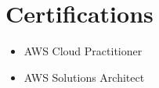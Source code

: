 \documentclass[letterpaper,11pt]{article}
\newcommand{\resumeSubHeadingListStart}{\begin{itemize}[leftmargin=0.0in, label={}]}
\begin{document}
\vspace{-5pt}
  \section{Certifications}
        \begin{multicols}{3}
            \begin{itemize}[itemsep=-5pt, parsep=5pt]
              \item AWS Cloud Practitioner
              \item AWS Solutions Architect
            \end{itemize}
        \end{multicols}
\vspace*{2.0\multicolsep}


\vspace{-5pt}
\end{document}
